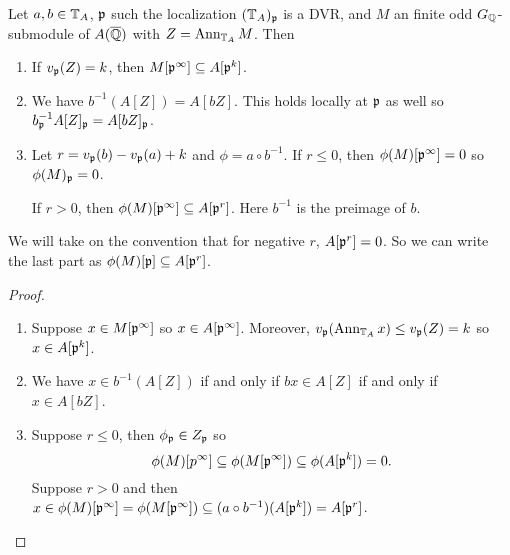 \documentclass[11pt, proquest]{uwthesis}
\begin{document}
\begin{lemma}\label{lem:com_alg}
    Let $a,b\in \mathbb{T}_A$, $\mathfrak{p}$ such the localization $(\mathbb{T}_A)_{\mathfrak{p}}$ is a DVR, and
    $M$ an finite odd $G_{\mathbb{Q}}$-submodule of $A(\overline{\mathbb{Q}})$ with $Z=\operatorname{Ann}_{\mathbb{T}_A} M$.
    Then
    \begin{enumerate}
        \item 
            If $v_{\mathfrak{p}}(Z) = k$, then $M[\mathfrak{p}^\infty]\subseteq A[\mathfrak{p}^k]$.
        \item
            We have $b^{-1}(A[Z])=A[bZ]$. This holds locally at $\mathfrak{p}$ as well so
            $b_{\mathfrak{p}} ^{-1} A[Z]_{\mathfrak{p}} = A[bZ]_{\mathfrak{p}}$.
        \item
            Let $r=v_{\mathfrak{p}}(b)-v_{\mathfrak{p}}(a)+k$ and $\phi=a\circ b^{-1}$. If $r\leq
            0$, then $\phi(M)[\mathfrak{p}^\infty]=0$ so $\phi(M)_{\mathfrak{p}}=0$.
            
            If $r>0$, then
            $\phi(M)[\mathfrak{p}^\infty]\subseteq A[\mathfrak{p}^r]$. Here $b^{-1}$ is the
            preimage of $b$.
    \end{enumerate}
    We will take on the convention that for negative $r$, $A[\mathfrak{p}^r]=0$. So we can
    write the last part as $\phi(M)[\mathfrak{p}]\subseteq A[\mathfrak{p}^r]$.
\end{lemma}
\begin{proof}
    \mbox{}
    \begin{enumerate}
        \item 
            Suppose $x\in M[\mathfrak{p}^\infty]$ so $x\in A[\mathfrak{p}^\infty]$. Moreover,
            $v_{\mathfrak{p}}(\operatorname{Ann}_{\mathbb{T}_A} x) \leq v_{\mathfrak{p}}(Z) = k$ so $x\in A[\mathfrak{p}^k]$.
        \item
            We have $x\in b^{-1}(A[Z])$ if and only if $bx \in A[Z]$ if and
            only if $x\in A[bZ]$.
        \item
            Suppose $r\leq 0$, then $\phi_{\mathfrak{p}} \in Z_{\mathfrak{p}}$ so
            \[
                \phi(M)[p^\infty]\subseteq \phi(M[\mathfrak{p}^\infty])
                \subseteq \phi(A[\mathfrak{p}^k]) = 0.
            \]
            Suppose $r>0$ and then $x\in \phi(M)[\mathfrak{p}^\infty] =
            \phi(M[\mathfrak{p}^\infty])\subseteq (a\circ
            b^{-1})(A[\mathfrak{p}^k])=A[\mathfrak{p}^r]$.
    \end{enumerate}
\end{proof}
\end{document}
